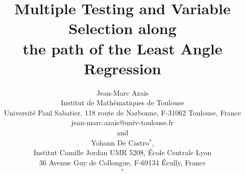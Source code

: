 \documentclass[final,numbib]{imaiai}%
\numberwithin{equation}{section}
\def\\bUnif{\text{\bUnif}}
\newcommand{\<}{\langle}
\renewcommand{\>}{\rangle}
\newcommand{\1}{\mathds{1}}
\begin{document}
\title{Multiple Testing and Variable Selection along\\ the path of the Least Angle Regression}


\author{{%
\sc Jean-Marc Aza\"is}\\[2pt]
Institut de Math\'ematiques de Toulouse\\ Universit\'e Paul Sabatier, 118 route de Narbonne, F-31062 Toulouse, France\\
{jean-marc.azais@univ-toulouse.fr}
\\[6pt]
{\sc and}\\[6pt]
{\sc Yohann De Castro}$^*$,\\[2pt]
Institut Camille Jordan UMR 5208, \'Ecole Centrale Lyon
 \\ 36 Avenue Guy de Collongue, F-69134 Écully, France\\
$^*${}}


\maketitle
\end{document}
